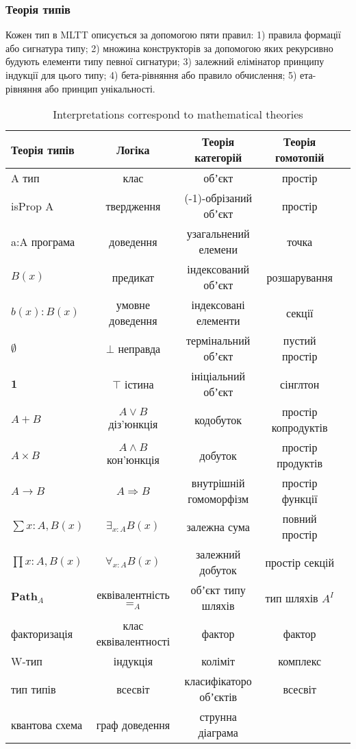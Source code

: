 \subsubsection{Теорія типів}
Кожен тип в MLTT описується за допомогою пяти правил:
1) правила формації або сигнатура типу;
2) множина конструкторів за допомогою яких рекурсивно будують елементи типу певної сигнатури;
3) залежний елімінатор принципу індукції для цього типу;
4) бета-рівняння або правило обчислення;
5) ета-рівняння або принцип унікальності.

\begin{table}
\centering
  \caption{Interpretations correspond to mathematical theories}
 \begin{tabular}{lcccc}
    \hline
       \textbf{Теорія типів} & \textbf{Логіка} & \textbf{Теорія категорій} & \textbf{Теорія гомотопій} \\
    \hline
       A тип & клас & обʼєкт & простір \\
       isProp A & твердження & (-1)-обрізаний обʼєкт & простір \\
       a:A програма & доведення & узагальнений елемени & точка \\
       $B(x)$ & предикат & індексований обʼєкт & розшарування \\
       $b(x) : B(x)$ & умовне доведення & індексовані елементи & секції\\
       $\emptyset$ & $\bot$ неправда & термінальний обʼєкт & пустий простір \\
       $\mathbf{1}$ & $\top$ істина & ініціальний обʼєкт & сінглтон \\
       $A + B$ & $A\vee B$ діз'юнкція & кодобуток & простір копродуктів \\
       $A\times B$ & $A\wedge B$ кон'юнкція & добуток & простір продуктів \\
       $A\to B$ & $A\Rightarrow B$ & внутрішній гомоморфізм & простір функції \\
       $\sum{x:A},B(x)$ & $\exists_{x:A}B(x)$ & залежна сума & повний простір \\
       $\prod{x:A},B(x)$ & $\forall_{x:A}B(x)$ & залежний добуток & простір секцій\\
       $\mathbf{Path}_{A}$ & еквівалентність $=_A$ & обʼєкт типу шляхів & тип шляхів $A^I$ \\
       факторизація & клас еквівалентності & фактор & фактор \\
       W-тип & індукція & коліміт & комплекс\\
       тип типів & всесвіт & класифікаторо обʼєктів & всесвіт \\
       квантова схема & граф доведення & струнна діаграма & \\
      \hline
  \end{tabular}
\end{table}

